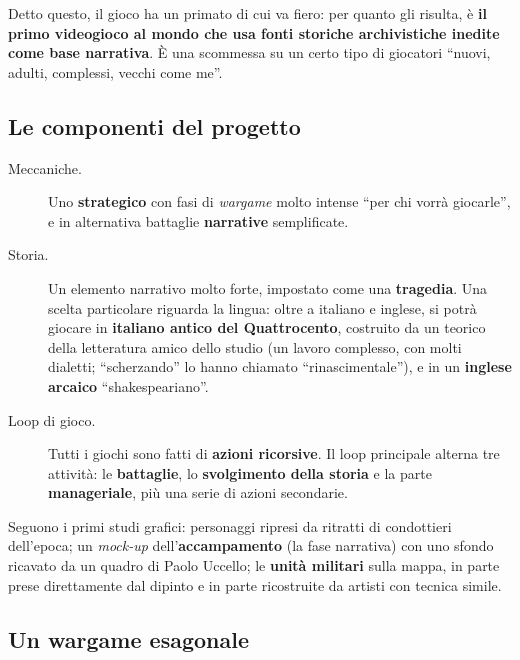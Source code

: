 Detto questo, il gioco ha un primato di cui va fiero: per quanto gli risulta, è
\textbf{il primo videogioco al mondo che usa fonti storiche archivistiche
inedite come base narrativa}. È una scommessa su un certo tipo di giocatori
``nuovi, adulti, complessi, vecchi come me''.

\subsection{Le componenti del progetto}

\begin{description}
  \item[Meccaniche.] Uno \textbf{strategico} con fasi di \emph{wargame} molto
        intense ``per chi vorrà giocarle'', e in alternativa battaglie
        \textbf{narrative} semplificate.
  \item[Storia.] Un elemento narrativo molto forte, impostato come una
        \textbf{tragedia}. Una scelta particolare riguarda la lingua: oltre a
        italiano e inglese, si potrà giocare in \textbf{italiano antico del
        Quattrocento}, costruito da un teorico della letteratura amico dello
        studio (un lavoro complesso, con molti dialetti; ``scherzando'' lo hanno
        chiamato ``rinascimentale''), e in un \textbf{inglese arcaico}
        ``shakespeariano''.
  \item[Loop di gioco.] Tutti i giochi sono fatti di \textbf{azioni
        ricorsive}. Il loop principale alterna tre attività: le
        \textbf{battaglie}, lo \textbf{svolgimento della storia} e la parte
        \textbf{manageriale}, più una serie di azioni secondarie.
\end{description}

Seguono i primi studi grafici: personaggi ripresi da ritratti di condottieri
dell'epoca; un \emph{mock-up} dell'\textbf{accampamento} (la fase narrativa) con
uno sfondo ricavato da un quadro di Paolo Uccello; le \textbf{unità militari}
sulla mappa, in parte prese direttamente dal dipinto e in parte ricostruite da
artisti con tecnica simile.

\subsection{Un wargame esagonale}

